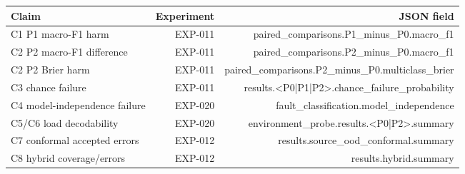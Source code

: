 \begin{tabular}{lrr}
\hline
Claim & Experiment & JSON field \\
\hline
C1 P1 macro-F1 harm & EXP-011 & paired\_comparisons.P1\_minus\_P0.macro\_f1 \\
C2 P2 macro-F1 difference & EXP-011 & paired\_comparisons.P2\_minus\_P0.macro\_f1 \\
C2 P2 Brier harm & EXP-011 & paired\_comparisons.P2\_minus\_P0.multiclass\_brier \\
C3 chance failure & EXP-011 & results.<P0|P1|P2>.chance\_failure\_probability \\
C4 model-independence failure & EXP-020 & fault\_classification.model\_independence \\
C5/C6 load decodability & EXP-020 & environment\_probe.results.<P0|P2>.summary \\
C7 conformal accepted errors & EXP-012 & results.source\_ood\_conformal.summary \\
C8 hybrid coverage/errors & EXP-012 & results.hybrid.summary \\
\hline
\end{tabular}
